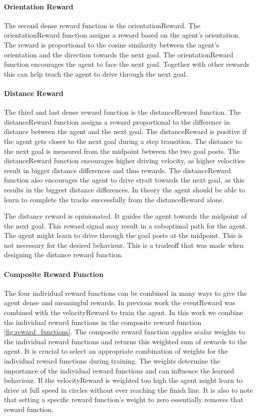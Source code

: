 \paragraph{Orientation Reward}
The second dense reward function is the orientationReward. The orientationReward function assigns a reward based on the agent's orientation. The reward is proportional to the cosine similarity between the agent's orientation and the direction towards the next goal. The orientationReward function encourages the agent to face the next goal. Together with other rewards this can help teach the agent to drive through the next goal.

\paragraph{Distance Reward}
The third and last dense reward function is the distanceReward function. The distanceReward function assigns a reward proportional to the difference in distance between the agent and the next goal. The distanceReward is positive if the agent gets closer to the next goal during a step transition. The distance to the next goal is measured from the midpoint between the two goal posts. The distanceReward function encourages higher driving velocity, as higher velocities result in bigger distance differences and thus rewards. The distanceReward function also encourages the agent to drive strait towards the next goal, as this results in the biggest distance differences. In theory the agent should be able to learn to complete the tracks successfully from the distanceReward alone.

The distance reward is opinionated. It guides the agent towards the midpoint of the next goal. This reward signal may result in a suboptimal path for the agent. The agent might learn to drive through the goal posts at the midpoint. This is not necessary for the desired behaviour. This is a tradeoff that was made when designing the distance reward function.

\paragraph{Composite Reward Function}
The four individual reward functions can be combined in many ways to give the agent dense and meaningful rewards. In previous work the eventReward was combined with the velocityReward to train the agent. In this work we combine the individual reward functions in the composite reward function \ref{fig:reward_functions}. The composite reward function applies scalar weights to the individual reward functions and returns this weighted sum of rewards to the agent. It is crucial to select an appropriate combination of weights for the individual reward functions during training. The weights determine the importance of the individual reward functions and can influence the learned behaviour. If the velocityReward is weighted too high the agent might learn to drive at full speed in circles without ever reaching the finish line. It is also to note that setting a specific reward function's weight to zero essentially removes that reward function.

